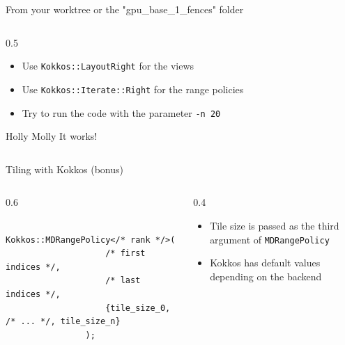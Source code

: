 \documentclass[
    aspectratio=169,
]{beamer}
\begin{document}
\begin{exerciseframe}{\small From your worktree or the "gpu\_base\_1\_fences" folder}
    \begin{columns}
        \begin{column}{0.5\linewidth}
            \begin{itemize}
                \item Use \texttt{Kokkos::LayoutRight} for the views
                \item Use \texttt{Kokkos::Iterate::Right} for the range policies
                \item Try to run the code with the parameter \texttt{-n 20}
            \end{itemize}
            \pause
            \vspace{1em}
            \begin{block}{Holly Molly}
                It works!
            \end{block}
        \end{column}
    \end{columns}
\end{exerciseframe}

\begin{frame}[fragile]{Tiling with Kokkos (bonus)}
    \begin{columns}
        \begin{column}{0.6\linewidth}
            \begin{verbatim}
                Kokkos::MDRangePolicy</* rank */>(
                    /* first indices */,
                    /* last indices */,
                    {tile_size_0, /* ... */, tile_size_n}
                );
            \end{verbatim}
        \end{column}
        \begin{column}{0.4\linewidth}
            \begin{itemize}
                \item Tile size is passed as the third argument of \texttt{MDRangePolicy}
                \item Kokkos has default values depending on the backend
            \end{itemize}
        \end{column}
    \end{columns}
\end{frame}
\end{document}
